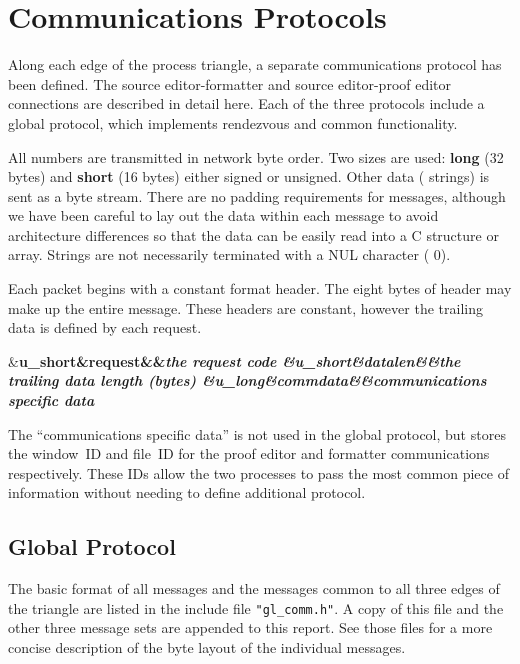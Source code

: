\columns
\def\elt#1#2#3{\tabalign&\bf #1&\rm #2&&\it #3\cr}

\section{Communications Protocols}

Along each edge of the process triangle, a separate communications
protocol has been defined.  The source editor-formatter and
source editor-proof editor connections are described in detail here.
Each of the three protocols include a global protocol, which
implements rendezvous and common functionality.

All numbers are transmitted in network byte order.  Two sizes are
used: {\bf long} (32 bytes) and {\bf short} (16 bytes) either signed
or unsigned.  Other data ({\ASCII} strings) is sent as a byte stream.
There are no padding requirements for messages, although we have been
careful to lay out the data within each message to avoid architecture
differences so that the data can be easily read into a C structure or
array.  Strings are not necessarily terminated with a NUL character
({\ASCII} 0).

Each packet begins with a constant format header.  The eight bytes of
header may make up the entire message.  These headers are constant,
however the trailing data is defined by each request.

\smallskip
\elt{u\_short}{request}{the request code}
\elt{u\_short}{datalen}{the trailing data length (bytes)}
\elt{u\_long}{commdata}{communications specific data}
\smallskip

The ``communications specific data'' is not used in the global
protocol, but stores the window~ID and file~ID for the proof editor
and formatter communications respectively.  These IDs allow the two
processes to pass the most common piece of information without
needing to define additional protocol.

\subsection{Global Protocol}

The basic format of all messages and the messages common to all three
edges of the triangle are listed in the include file {\tt "gl\_comm.h"}.
A copy of this file and the other three message sets are appended to
this report.  See those files for a more concise description of
the byte layout of the individual messages.

